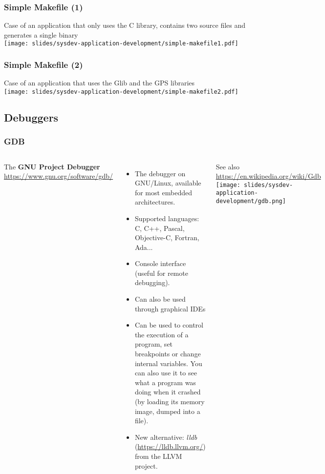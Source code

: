 \begin{frame}[fragile]
  \frametitle{Simple Makefile (1)}
  Case of an application that only uses the C library, contains two source
  files and generates a single binary\\
  \texttt{[image: slides/sysdev-application-development/simple-makefile1.pdf]}
\end{frame}

\begin{frame}[fragile]
  \frametitle{Simple Makefile (2)}
  Case of an application that uses the Glib and the GPS libraries\\
  \texttt{[image: slides/sysdev-application-development/simple-makefile2.pdf]}\\
\end{frame}

\subsection{Debuggers}

\begin{frame}
  \frametitle{GDB}
  \fontsize{11}{11}\selectfont
  \begin{columns}[T]
    The {\bf GNU Project Debugger}\\
    \url{https://www.gnu.org/software/gdb/}
    \begin{itemize}
    \item The debugger on GNU/Linux, available for most embedded
      architectures.
    \item Supported languages: C, C++, Pascal, Objective-C, Fortran,
      Ada...
    \item Console interface (useful for remote debugging).
    \item Can also be used through graphical IDEs
    \item Can be used to control the execution of a program, set
      breakpoints or change internal variables. You can also use it to
      see what a program was doing when it crashed (by loading its
      memory image, dumped into a  file).
    \item New alternative: {\em lldb} (\url{https://lldb.llvm.org/})\\
      from the LLVM project.
    \end{itemize}
    See also \url{https://en.wikipedia.org/wiki/Gdb}
    \texttt{[image: slides/sysdev-application-development/gdb.png]}
  \end{columns}
\end{frame}


